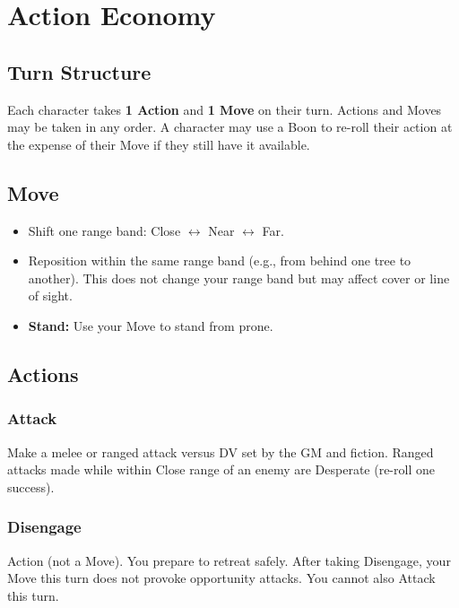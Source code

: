 
\section{Action Economy}

\subsection{Turn Structure}

Each character takes \textbf{1 Action} and \textbf{1 Move} on their turn. Actions and Moves may be taken in any order. A character may use a Boon to re-roll their action at the expense of their Move if they still have it available.

\subsection{Move}

\begin{itemize}
  \item Shift one range band: Close $\leftrightarrow$ Near $\leftrightarrow$ Far.
  \item Reposition within the same range band (e.g., from behind one tree to another). This does not change your range band but may affect cover or line of sight.
  \item \textbf{Stand:} Use your Move to stand from prone.
\end{itemize}

\subsection{Actions}

\subsubsection{Attack}
Make a melee or ranged attack versus DV set by the GM and fiction. Ranged attacks made while within Close range of an enemy are Desperate (re-roll one success).

\subsubsection{Disengage}
Action (not a Move). You prepare to retreat safely. After taking Disengage, your Move this turn does not provoke opportunity attacks. You cannot also Attack this turn.

